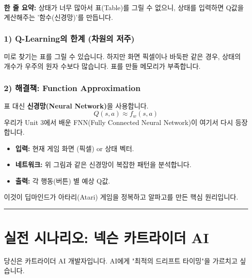 \documentclass[11pt,a4paper]{book}
\theoremstyle{definition}
\begin{document}
\begin{conceptbox}[title={개념 3: 노트를 뇌로 바꾸다}]
\textbf{한 줄 요약:} 상태가 너무 많아서 표(Table)를 그릴 수 없으니, 상태를 입력하면 Q값을 계산해주는 '함수(신경망)'를 만듭니다.
\end{conceptbox}

\subsubsection*{1) Q-Learning의 한계 (차원의 저주)}
미로 찾기는 표를 그릴 수 있습니다. 하지만 화면 픽셀이나 바둑판 같은 경우, 상태의 개수가 우주의 원자 수보다 많습니다. 표를 만들 메모리가 부족합니다.

\subsubsection*{2) 해결책: Function Approximation}
표 대신 \textbf{신경망(Neural Network)}을 사용합니다.
$$ Q(s, a) \approx f_w(s, a) $$
우리가 Unit 3에서 배운 FNN(Fully Connected Neural Network)이 여기서 다시 등장합니다.

\begin{itemize}
    \item \textbf{입력:} 현재 게임 화면 (픽셀) or 상태 벡터.
    \item \textbf{네트워크:} 위 그림과 같은 신경망이 복잡한 패턴을 분석합니다.
    \item \textbf{출력:} 각 행동(버튼) 별 예상 Q값.
\end{itemize}
이것이 딥마인드가 아타리(Atari) 게임을 정복하고 알파고를 만든 핵심 원리입니다.

\vspace{0.5cm}\hrule\vspace{0.5cm}

\section{실전 시나리오: 넥슨 카트라이더 AI}

\begin{storybox}[title={Scenario: 드리프트 장인 AI 만들기}]
당신은 카트라이더 AI 개발자입니다. AI에게 "최적의 드리프트 타이밍"을 가르치고 싶습니다.
\end{storybox}
\end{document}
